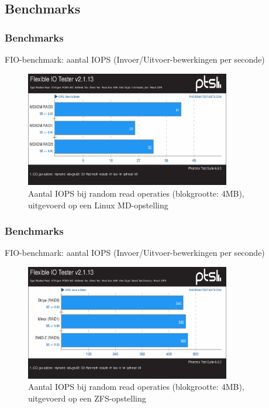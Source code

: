 \documentclass{beamer}
\begin{document}

\subsection{Benchmarks}



\begin{frame}
  \frametitle{Benchmarks}
  FIO-benchmark: aantal IOPS (Invoer/Uitvoer-bewerkingen per seconde)    
  \begin{figure}
    \centering
    \includegraphics[width=0.8\textwidth]{img/Testen/FIO-4MB/fio-randomread-4mb-md}
    \caption{Aantal IOPS bij random read operaties (blokgrootte: 4MB), uitgevoerd op een Linux MD-opstelling}
  \end{figure}
\end{frame}


\begin{frame}
  \frametitle{Benchmarks}
  FIO-benchmark: aantal IOPS (Invoer/Uitvoer-bewerkingen per seconde)    
  \begin{figure}
    \centering
    \includegraphics[width=0.8\textwidth]{img/Testen/FIO-4MB/fio-randomread-4mb-zfs}
    \caption{Aantal IOPS bij random read operaties (blokgrootte: 4MB), uitgevoerd op een ZFS-opstelling}
  \end{figure}
\end{frame}
\end{document}
